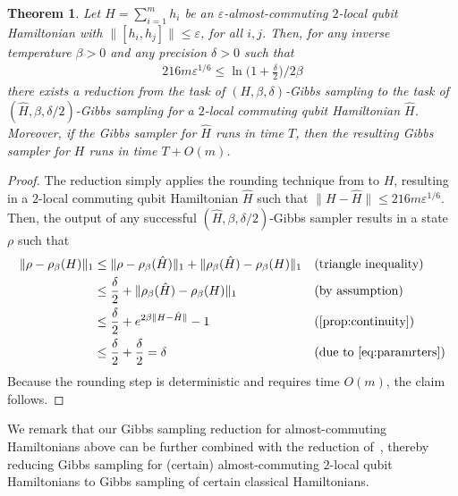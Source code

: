 \documentclass[a4paper,onecolumn,11pt]{quantumarticle}
\theoremstyle{plain}
\newtheorem{theorem}{Theorem}[section]
\newcommand{\eps}{\varepsilon}
\begin{document}
\begin{theorem} 
Let $H = \sum_{i=1}^m h_i$ be an $\eps$-almost-commuting $2$-local qubit Hamiltonian with $\| [h_i,h_j]\| \leq \eps$, for all $i,j$. Then, for any inverse temperature $\beta >0$ and any precision $\delta >0$ such that
\begin{align}\label{eq:paramrters}
216 m \eps^{1/6} \leq  \ln\Big(1+\frac{\delta}{2} \Big)/2\beta
\end{align}
there exists a reduction from the task of $(H,\beta,\delta)$-Gibbs sampling to the task of $(\hat{H},\beta,\delta/2)$-Gibbs sampling for a $2$-local commuting qubit Hamiltonian $\hat{H}$. Moreover, if the Gibbs sampler for $\hat{H}$ runs in time $T$, then the resulting Gibbs sampler for $H$ runs in time $T + O(m)$.
\end{theorem}
\begin{proof}
The reduction simply applies the rounding technique from  to $H$, resulting in a $2$-local commuting qubit Hamiltonian $\hat{H}$ such that $\| H - \hat{H} \| \leq 216 m \eps^{1/6}$. Then, the output of any successful $(\hat{H},\beta,\delta/2)$-Gibbs sampler results in a state $\rho$ such that
\begin{align*}
\| \rho - \rho_\beta(H) \|_1 
&\leq \| \rho - \rho_\beta(\hat{H}) \|_1  + \| \rho_\beta(\hat{H}) - \rho_\beta(H) \|_1    && (\text{triangle inequality})\\
&\leq \frac{\delta}{2} + \| \rho_\beta(\hat{H}) - \rho_\beta(H) \|_1 && (\text{by assumption})\\
&\leq  \frac{\delta}{2}  + e^{2 \beta \| H - \hat{H} \|} -1  && (\text{\Cref{prop:continuity}})\\
&\leq \frac{\delta}{2} + \frac{\delta}{2}  = \delta  && (\text{due to~\eqref{eq:paramrters}})
\end{align*}
Because the rounding step is deterministic and requires time $O(m)$, the claim follows.
\end{proof}
We remark that our Gibbs sampling reduction for almost-commuting Hamiltonians above can be further combined with the reduction of~\cite[Theorem 9]{hwang2025gibbsstatepreparationcommuting}, thereby reducing Gibbs sampling for (certain) almost-commuting $2$-local qubit Hamiltonians to Gibbs sampling of certain classical Hamiltonians.
\end{document}
